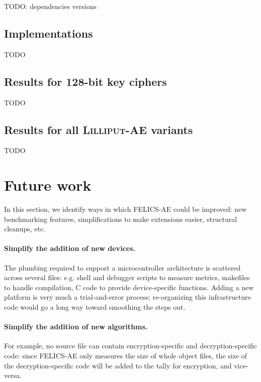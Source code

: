 \documentclass{article}
\begin{document}
TODO: dependencies versions

\subsection{Implementations}
\label{sec:results/implementations}

TODO

\subsection{Results for 128-bit key ciphers}
\label{sec:results/128}

TODO

\subsection{Results for all \textsc{Lilliput-AE} variants}
\label{sec:results/lilliputae}

TODO

\section{Future work}
\label{sec:future}

In this section, we identify ways in which FELICS-AE could be
improved: new benchmarking features, simplifications to make
extensions easier, structural cleanups, etc.

\paragraph{Simplify the addition of new devices.}

The plumbing required to support a microcontroller architecture is
scattered across several files: e.g. shell and debugger scripts to
measure metrics, makefiles to handle compilation, C code to provide
device-specific functions.  Adding a new platform is very much a
trial-and-error process; re-organizing this infrastructure code would
go a long way toward smoothing the steps out.

\paragraph{Simplify the addition of new algorithms.}

For example, no source file can contain encryption-specific and
decryption-specific code: since FELICS-AE only measures the size of
whole object files, the size of the decryption-specific code will be
added to the tally for encryption, and vice-versa.
\end{document}
